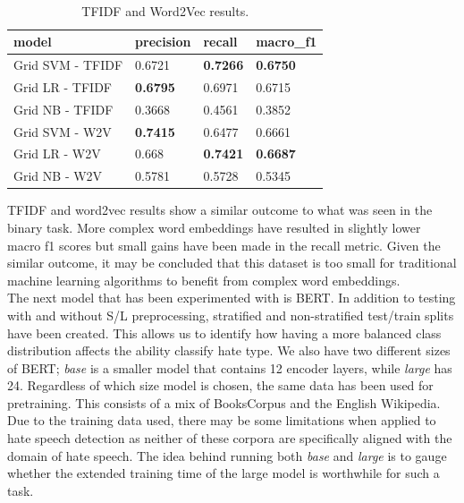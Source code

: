 \documentclass[conference]{IEEEtran}
\begin{document}
\begin{table}[H]
\centering
\begin{tabular}{|l|l|l|l|}
\hline
    model   & precision   & recall & macro\_f1     \\ \hline
Grid SVM - TFIDF &	0.6721 &	\textbf{0.7266} &	\textbf{0.6750}\\
Grid LR - TFIDF	 & \textbf{0.6795} &	0.6971 &	0.6715\\
Grid NB - TFIDF &	0.3668 &	0.4561 &	0.3852\\ \hline

Grid SVM - W2V &	\textbf{0.7415} &	0.6477 &	0.6661\\
Grid LR - W2V &	0.668 &	\textbf{0.7421} &	\textbf{0.6687}\\
Grid NB - W2V &	0.5781 &	0.5728 &	0.5345\\ \hline
\end{tabular}
\caption{\label{tab:TFIDF-multi-results}\\ TFIDF and Word2Vec results.}
\end{table}

TFIDF and word2vec results show a similar outcome to what was seen in the binary task.  More complex word embeddings have resulted in slightly lower macro f1 scores but small gains have been made in the recall metric. Given the similar outcome, it may be concluded that this dataset is too small for traditional machine learning algorithms to benefit from complex word embeddings.\\

The next model that has been experimented with is BERT. In addition to testing with and without S/L preprocessing, stratified and non-stratified test/train splits have been created. This allows us to identify how having a more balanced class distribution affects the ability classify hate type. We also have two different sizes of BERT; \textit{base} is a smaller model that contains 12 encoder layers, while \textit{large} has 24. Regardless of which size model is chosen, the same data has been used for pretraining. This consists of a mix of BooksCorpus and the English Wikipedia\cite{6}. Due to the training data used, there may be some limitations when applied to hate speech detection as neither of these corpora are specifically aligned with the domain of hate speech. The idea behind running both \textit{base} and \textit{large} is to gauge whether the extended training time of the large model is worthwhile for such a task.
\end{document}
